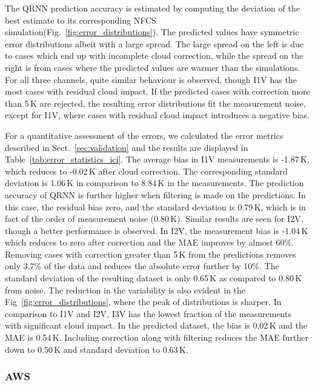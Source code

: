 \documentclass[amt]{copernicus}
\begin{document}
The QRNN prediction accuracy is estimated by computing the deviation of the best estimate to its corresponding NFCS simulation(Fig.~\ref{fig:error_distributions}). The predicted values have symmetric error distributions albeit with a large spread. The large spread on the left is due to cases which end up with incomplete cloud correction, while the spread on the right is from cases where the predicted values are warmer than the simulations. For all three channels, quite similar behaviour is observed, though I1V has the most cases with residual cloud impact. If the predicted cases with correction more than 5\,K are rejected, the resulting error distributions fit the measurement noise, except for I1V, where cases with residual cloud impact introduces a negative bias. 

For a quantitative assessment of the errors, we calculated the error metrics described in Sect.~\ref{sec:validation} and the results are displayed in Table~\ref{tab:error_statistics_ici}. The average bias in I1V measurements is -1.87\,K, which reduces to -0.02\,K after cloud correction. The corresponding standard deviation is 1.06\,K in comparison to 8.84\,K in the measurements. The prediction accuracy of QRNN is further higher when filtering is made on the predictions. In this case, the residual bias zero, and the standard deviation is 0.79\,K, which is in fact of the order of measurement noise (0.80\,K). Similar results are seen for I2V, though a better performance is observed. In I2V, the measurement bias is -1.04\,K which reduces to zero after correction and the MAE improves by almost 60\%. Removing cases with correction greater than 5\,K from the predictions removes only 3.7\% of the data and reduces the absolute error further by 10\%. The standard deviation of the resulting dataset is only 0.65\,K as compared to 0.80\,K from noise. The reduction in the variability is also evident in the Fig~\ref{fig:error_distributions}, where the peak of distributions is sharper. In comparison to I1V and I2V, I3V has the lowest fraction of the measurements with significant cloud impact. In the predicted dataset, the bias is 0.02\,K and the MAE is 0.54\,K. Including correction along with filtering reduces the MAE further down to 0.50\,K and standard deviation to 0.63\,K.  

\subsubsection{AWS}
\end{document}
